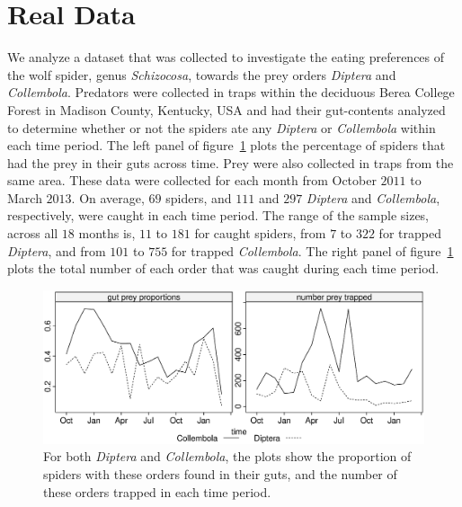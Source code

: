 \section{Real Data}
\label{sec:data}

We analyze a dataset that was collected to investigate the eating preferences of the wolf spider, genus \textit{Schizocosa}, towards the prey orders \textit{Diptera} and \textit{Collembola}.  Predators were collected in traps within the deciduous Berea College Forest in Madison County, Kentucky, USA and had their gut-contents analyzed to determine whether or not the spiders ate any \textit{Diptera} or \textit{Collembola} within each time period.  The left panel of figure~\ref{fig:data} plots the percentage of spiders that had the prey in their guts across time.  Prey were also collected in traps from the same area.  These data were collected for each month from October $2011$ to March $2013$.  On average, $69$ spiders, and $111$ and $297$ \textit{Diptera} and \textit{Collembola}, respectively, were caught in each time period.  The range of the sample sizes, across all $18$ months is, $11$ to $181$ for caught spiders, from $7$ to $322$ for trapped \textit{Diptera}, and from $101$ to $755$ for trapped \textit{Collembola}.  The right panel of figure~\ref{fig:data} plots the total number of each order that was caught during each time period. 

\begin{figure}
  \centering
  \includegraphics[scale=0.5]{data}
  \caption{For both \textit{Diptera} and \textit{Collembola}, the plots show the proportion of spiders with these orders found in their guts, and the number of these orders trapped in each time period.}
  \label{fig:data}
\end{figure}


